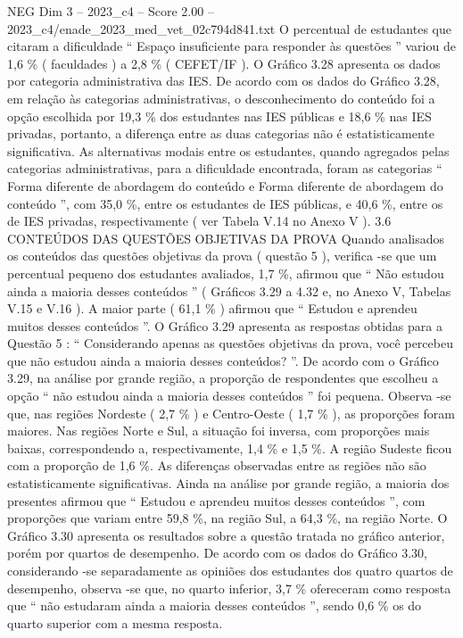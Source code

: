 \begin{textsample}{NEG Dim 3 – 2023\_c4 – Score 2.00 – 2023\_c4/enade\_2023\_med\_vet\_02c794d841.txt}
O percentual de estudantes que citaram a dificuldade “ Espaço insuficiente para responder às questões ” variou de 1,6 \% ( faculdades ) a 2,8 \% ( CEFET/IF ).
O Gráfico 3.28 apresenta os dados por categoria administrativa das IES.
De acordo com os dados do Gráfico 3.28, em relação às categorias administrativas, o desconhecimento do conteúdo foi a opção escolhida por 19,3 \% dos estudantes nas IES públicas e 18,6 \% nas IES privadas, portanto, a diferença entre as duas categorias não é estatisticamente significativa.
As alternativas modais entre os estudantes, quando agregados pelas categorias administrativas, para a dificuldade encontrada, foram as categorias “ Forma diferente de abordagem do conteúdo e Forma diferente de abordagem do conteúdo ”, com 35,0 \%, entre os estudantes de IES públicas, e 40,6 \%, entre os de IES privadas, respectivamente ( ver Tabela V.14 no Anexo V ). 3.6 CONTEÚDOS DAS QUESTÕES OBJETIVAS DA PROVA Quando analisados os conteúdos das questões objetivas da prova ( questão 5 ), verifica -se que um percentual pequeno dos estudantes avaliados, 1,7 \%, afirmou que “ Não estudou ainda a maioria desses conteúdos ” ( Gráficos 3.29 a 4.32 e, no Anexo V, Tabelas V.15 e V.16 ).
A maior parte ( 61,1 \% ) afirmou que “ Estudou e aprendeu muitos desses conteúdos ”.
O Gráfico 3.29 apresenta as respostas obtidas para a Questão 5 : “ Considerando apenas as questões objetivas da prova, você percebeu que não estudou ainda a maioria desses conteúdos? ”.
De acordo com o Gráfico 3.29, na análise por grande região, a proporção de respondentes que escolheu a opção “ não estudou ainda a maioria desses conteúdos ” foi pequena.
Observa -se que, nas regiões Nordeste ( 2,7 \% ) e Centro-Oeste ( 1,7 \% ), as proporções foram maiores.
Nas regiões Norte e Sul, a situação foi inversa, com proporções mais baixas, correspondendo a, respectivamente, 1,4 \% e 1,5 \%.
A região Sudeste ficou com a proporção de 1,6 \%.
As diferenças observadas entre as regiões não são estatisticamente significativas.
Ainda na análise por grande região, a maioria dos presentes afirmou que “ Estudou e aprendeu muitos desses conteúdos ”, com proporções que variam entre 59,8 \%, na região Sul, a 64,3 \%, na região Norte.
O Gráfico 3.30 apresenta os resultados sobre a questão tratada no gráfico anterior, porém por quartos de desempenho.
De acordo com os dados do Gráfico 3.30, considerando -se separadamente as opiniões dos estudantes dos quatro quartos de desempenho, observa -se que, no quarto inferior, 3,7 \% ofereceram como resposta que “ não estudaram ainda a maioria desses conteúdos ”, sendo 0,6 \% os do quarto superior com a mesma resposta.

\end{textsample}
